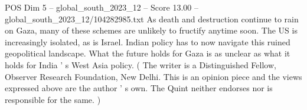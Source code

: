 \begin{textsample}{POS Dim 5 – global\_south\_2023\_12 – Score 13.00 – global\_south\_2023\_12/104282985.txt}
As death and destruction continue to rain on Gaza, many of these schemes are unlikely to fructify anytime soon.
The US is increasingly isolated, as is Israel.
Indian policy has to now navigate this ruined geopolitical landscape.
What the future holds for Gaza is as unclear as what it holds for India ' s West Asia policy. ( The writer is a Distinguished Fellow, Observer Research Foundation, New Delhi.
This is an opinion piece and the views expressed above are the author ' s own.
The Quint neither endorses nor is responsible for the same. )

\end{textsample}
